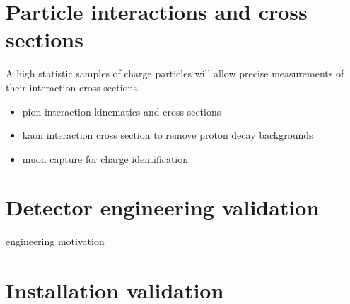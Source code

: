 
\section{Particle interactions and cross sections}


A high statistic samples of charge particles will allow precise measurements of their interaction cross sections.
\begin{itemize}
\item pion interaction kinematics and cross sections
\item kaon interaction cross section to remove proton decay backgrounds
\item muon capture for charge identification
\end{itemize}



\section{Detector engineering validation}
engineering motivation

\section{Installation validation}




